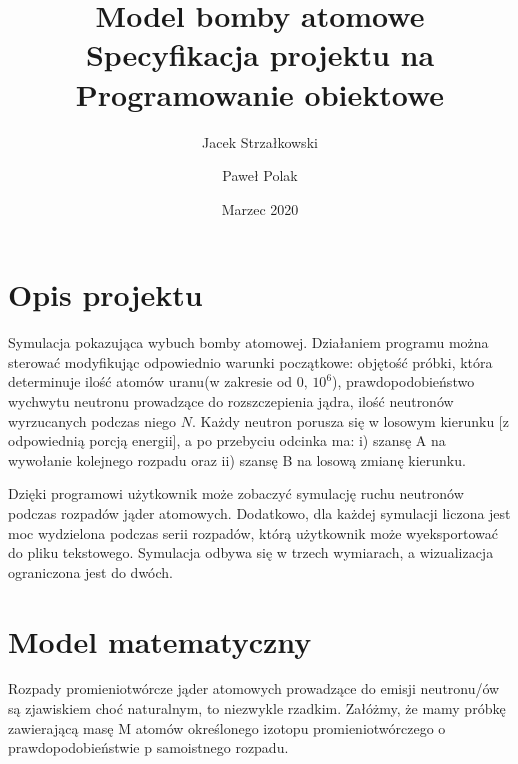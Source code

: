 \documentclass[12pt, a4paper, oneside]{article}
\title{Model bomby atomowe \\ Specyfikacja projektu na Programowanie obiektowe}%
\author{Jacek Strzałkowski \and Paweł Polak}
\date{Marzec 2020}
\begin{document}
\maketitle
\section{Opis projektu}
Symulacja pokazująca wybuch bomby atomowej. Działaniem programu można sterować modyfikując odpowiednio warunki początkowe: objętość próbki, która determinuje ilość atomów uranu(w zakresie od $0\text{, }10^6$), prawdopodobieństwo wychwytu neutronu prowadzące do rozszczepienia jądra,  ilość neutronów wyrzucanych podczas niego $N$. Każdy neutron porusza się w losowym kierunku [z odpowiednią porcją energii], a po przebyciu odcinka ma: i) szansę A na wywołanie kolejnego rozpadu oraz ii) szansę B na losową zmianę kierunku.


Dzięki programowi użytkownik może zobaczyć symulację ruchu neutronów podczas rozpadów jąder atomowych. Dodatkowo, dla każdej symulacji liczona jest moc wydzielona podczas serii rozpadów, którą użytkownik może wyeksportować do pliku tekstowego. Symulacja odbywa się w trzech wymiarach, a wizualizacja ograniczona jest do dwóch.

\section{Model matematyczny}
Rozpady promieniotwórcze jąder atomowych prowadzące do emisji neutronu/ów są zjawiskiem choć naturalnym, to niezwykle rzadkim. Załóżmy, że mamy próbkę zawierającą masę M atomów określonego izotopu promieniotwórczego o prawdopodobieństwie p samoistnego rozpadu.
\end{document}
